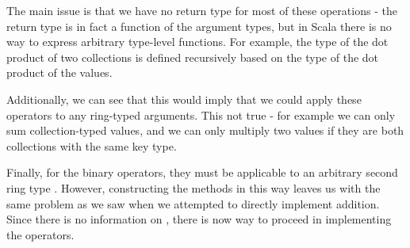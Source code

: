 The main issue is that we have no return type for most of these operations - the return type is in fact a function of the argument types, but in Scala there is no way to express arbitrary type-level functions. For example, the  type of the dot product of two collections is defined recursively based on the type of the dot product of the values.

Additionally, we can see that this would imply that we could apply these operators to any ring-typed arguments. This not true - for example we can only sum collection-typed values, and we can only multiply two values if they are both collections with the same key type.

Finally, for the binary operators, they must be applicable to an arbitrary second ring type . However, constructing the methods in this way leaves us with the same problem as we saw when we attempted to directly implement addition. Since there is no information on , there is now way to proceed in implementing the operators.


